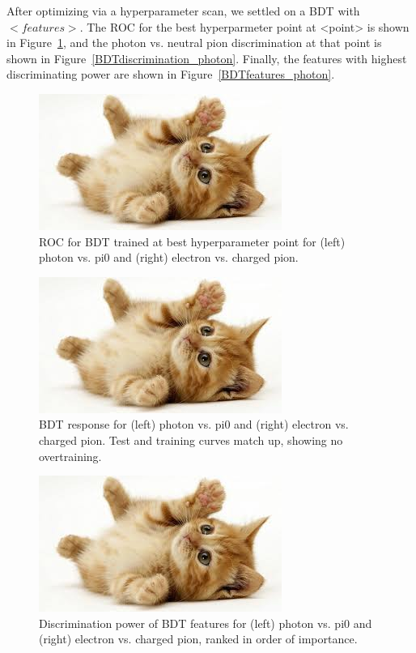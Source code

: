\documentclass{article}
\begin{document}
    After optimizing via a hyperparameter scan, we settled on a BDT with $<features>$. The ROC for the best hyperparmeter point at <point> is shown in Figure~\ref{BDTROC}, and the photon vs. neutral pion discrimination at that point is shown in Figure~\ref{BDTdiscrimination_photon}. Finally, the features with highest discriminating power are shown in Figure~\ref{BDTfeatures_photon}.

    \begin{figure}
        \begin{center}
            \includegraphics{images/cat-thumb.jpeg}
        \end{center}
        \caption{ROC for BDT trained at best hyperparameter point for (left) photon vs. pi0 and (right) electron vs. charged pion.}
        \label{BDTROC}
    \end{figure}

    \begin{figure}
        \begin{center}
            \includegraphics{images/cat-thumb.jpeg}
        \end{center}
        \caption{BDT response for (left) photon vs. pi0 and (right) electron vs. charged pion. Test and training curves match up, showing no overtraining.}
        \label{BDTdiscrimination}
    \end{figure}

    \begin{figure}
        \begin{center}
            \includegraphics{images/cat-thumb.jpeg}
        \end{center}
        \caption{Discrimination power of BDT features for (left) photon vs. pi0 and (right) electron vs. charged pion, ranked in order of importance.}
        \label{BDTfeatures}
    \end{figure}
\end{document}
